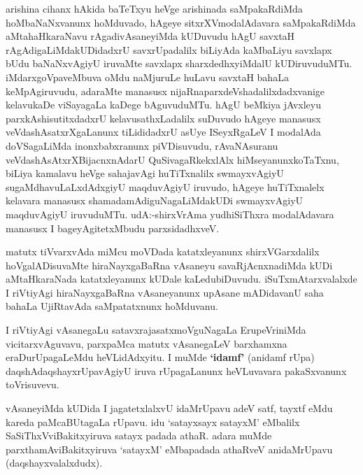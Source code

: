 \centerline{}

\begin{artha}
arishina cihanx hAkida baTeTxyu heVge arishinada saMpakaRdiMda
hoMbaNaNxvanunx hoMduvado, hAgeye sitxrXVmodalAdavara saMpakaRdiMda
aMtahaHkaraNavu rAgadivAsaneyiMda kUDuvudu hAgU savxtaH
rAgAdigaLiMdakUDidadxrU savxrUpadalilx biLiyAda kaMbaLiyu savxlapx
bUdu baNaNxvAgiyU iruvaMte savxlapx sharxdedhxyiMdalU
kUDiruvuduMTu. iMdarxgoVpaveMbuva oMdu naMjuruLe huLavu savxtaH bahaLa
keMpAgiruvudu, adaraMte manasusx nijaRnaparxdeVshadalilxdadxvanige
kelavukaDe viSayagaLa kaDege bAguvuduMTu. hAgU beMkiya jAvxleyu
parxkAshisutitxdadxrU kelavusathxLadalilx suDuvudo hAgeye manasusx
veVdashAsatxrXgaLanunx tiLididadxrU asUye ISeyxRgaLeV I modalAda
doVSagaLiMda inonxbabxranunx piVDisuvudu, rAvaNAsuranu
veVdashAsAtxrXBijacnxnAdarU QuSivagaRkekxlAlx hiMseyanunxkoTaTxnu,
biLiya kamalavu heVge sahajavAgi huTiTxnalilx swmayxvAgiyU
sugaMdhavuLaLxdAdxgiyU maqduvAgiyU iruvudo, hAgeye huTiTxnalelx
kelavara manasusx shamadamAdiguNagaLiMdakUDi swmayxvAgiyU maqduvAgiyU
iruvuduMTu. udA:-shirxVrAma yudhiSiThxra modalAdavara manasusx I
bageyAgitetxMbudu parxsidadhxveV.
\end{artha}

\begin{artha}
matutx tiVvarxvAda miMcu moVDada katatxleyanunx shirxVGarxdalilx
hoVgalADisuvaMte hiraNayxgaBaRna vAsaneyu savaRjAcnxnadiMda kUDi
aMtaHkaraNada katatxleyanunx kUDale kaLedubiDuvudu. iSuTxmAtarxvalalxde
I riVtiyAgi hiraNayxgaBaRna vAsaneyanunx upAsane mADidavanU saha
bahaLa UjiRtavAda saMpatatxnunx hoMduvanu.
\end{artha}

\begin{artha}
I riVtiyAgi vAsanegaLu satavxrajasatxmoVguNagaLa ErupeVriniMda
vicitarxvAguvavu, parxpaMca matutx vAsanegaLeV barxhamxna
eraDurUpagaLeMdu heVLidAdxyitu. I muMde \textbf{`idamf'} (anidamf rUpa)
daqshAdaqshayxrUpavAgiyU iruva rUpagaLanunx heVLuvavara pakaSxvanunx toVrisuvevu.
\end{artha}

\centerline{}

\begin{artha}
 vAsaneyiMda kUDida I jagatetxlalxvU idaMrUpavu adeV satf, tayxtf eMdu kareda paMcaBUtagaLa rUpavu. idu `satayxsayx satayxM' eMbalilx SaSiThxVviBakitxyiruva satayx padada athaR. adara muMde parxthamAviBakitxyiruva `satayxM' eMbapadada athaRveV anidaMrUpavu (daqshayxvalalxdudx).
\end{artha}

